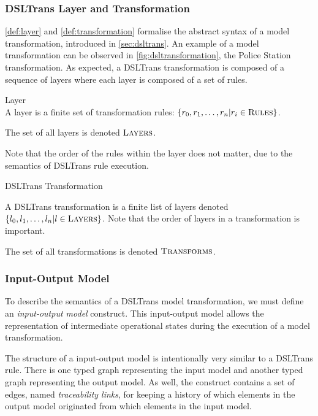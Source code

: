 \subsubsection*{DSLTrans Layer and Transformation}

\cref{def:layer} and \cref{def:transformation} formalise the abstract syntax of a model transformation, introduced in \cref{sec:dsltrans}. An example of a model transformation can be observed in \cref{fig:dsltransformation}, the Police Station transformation. As expected, a DSLTrans transformation is composed of a sequence of layers where each layer is composed of a set of rules.

\begin{definition}{Layer\\}
\label{def:layer}
A layer is a finite set of transformation rules: $\{r_0, r_1, \dots, r_n | r_i \in \textsc{Rules}\}$.

The set of all layers is denoted $\textsc{Layers}$. 
\end{definition}

Note that the order of the rules within the layer does not matter, due to the semantics of DSLTrans rule execution.

\begin{definition}{DSLTrans Transformation\\}
\label{def:transformation}

A DSLTrans transformation is a finite list of layers denoted $\{l_0, l_1, \dots, l_n | l \in \textsc{Layers}\}$. Note that the order of layers in a transformation is important.

The set of all transformations is denoted $\textsc{Transforms}$.

\end{definition}



\subsubsection*{Input-Output Model}

To describe the semantics of a DSLTrans model transformation, we must define an \textit{input-output model} construct. This input-output model allows the representation of intermediate operational states during the execution of a model transformation.

The structure of a input-output model is intentionally very similar to a DSLTrans rule. There is one typed graph representing the input model and another typed graph representing the output model. As well, the construct contains a set of edges, named \emph{traceability links}, for keeping a history of which elements in the output model originated from which elements in the input model.

